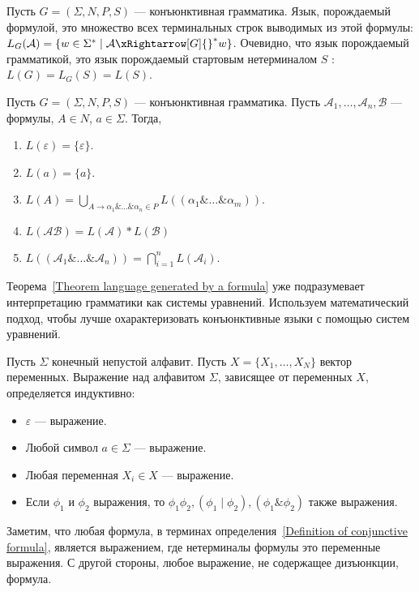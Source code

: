 \begin{definition}
	Пусть $G = (\Sigma,N,P,S)$ --- конъюнктивная грамматика. Язык, порождаемый формулой, это множество всех терминальных строк выводимых из этой формулы: $L_{G}(\mathcal{A}) = \{w\in\Sigma^* \mid \mathcal{A} \xRightarrow[G]{}^*w\}$. Очевидно, что язык порождаемый грамматикой, это язык порождаемый стартовым нетерминалом $S$ : $L(G) = L_{G}(S) = L(S)$.
\end{definition}

\begin{theorem}\label{Theorem language generated by a formula}
    Пусть $G = (\Sigma,N,P,S)$ --- конъюнктивная грамматика. Пусть $\mathcal{A}_1,\ldots,\mathcal{A}_n,\mathcal{B}$ --- формулы, $A \in N$, $a \in \Sigma$. Тогда,
    \begin{enumerate}
        \item $L(\varepsilon) = \{\varepsilon\}$.
        \item $L(a) = \{a\}$.
        \item $L(A) = \bigcup_{A \rightarrow \alpha_1\&\ldots\&\alpha_n \in P} L((\alpha_1\&\ldots\&\alpha_m))$.
        \item $L(\mathcal{AB}) = L(\mathcal{A})*L(\mathcal{B})$
        \item $L((\mathcal{A}_1\&\ldots\&\mathcal{A}_n)) = \bigcap_{i = 1}^{n}L(\mathcal{A}_i)$.
    \end{enumerate}
\end{theorem}

Теорема~\ref{Theorem language generated by a formula} уже подразумевает интерпретацию грамматики как системы уравнений. Используем математический подход, чтобы лучше охарактеризовать конъюнктивные языки с помощью систем уравнений.

\begin{definition}[Выражение]
    Пусть $\Sigma$ конечный непустой алфавит. Пусть $X = \{X_1,\ldots,X_N\}$ вектор переменных. Выражение над алфавитом $\Sigma$, зависящее от переменных $X$, определяется индуктивно:
    \begin{itemize}
	   \item $\varepsilon$ --- выражение.
	   \item Любой символ $a\in\Sigma$ --- выражение.
	   \item Любая переменная $X_i\in X$ --- выражение.
	   \item Если $\phi_1$ и $\phi_2$ выражения, то $\phi_1\phi_2, (\phi_1\mid\phi_2), (\phi_1\&\phi_2)$ также выражения.
	\end{itemize}
	Заметим, что любая формула, в терминах определения~\ref{Definition of conjunctive formula}, является выражением, где нетерминалы формулы это переменные выражения. С другой стороны, любое выражение, не содержащее дизъюнкции, формула.
\end{definition}

